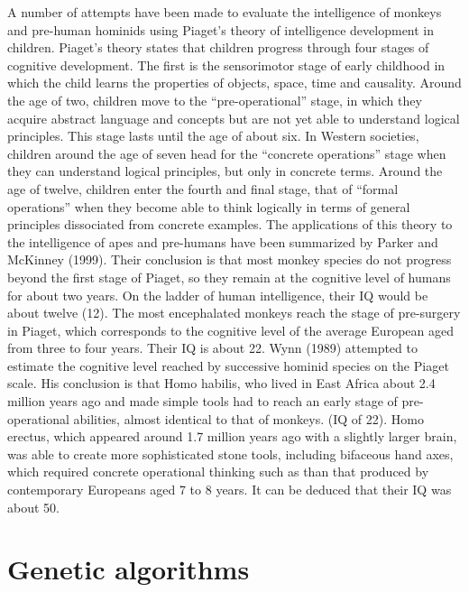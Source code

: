 A number of attempts have been made to evaluate the intelligence of monkeys and pre-human hominids
using Piaget’s theory of intelligence development in children. 
Piaget’s theory states that children progress through four stages of cognitive development.
The first is the sensorimotor stage of early childhood in which the child learns the properties of
objects, space, time and causality. 
Around the age of two, children move to the ``pre-operational'' stage, in which they acquire
abstract language and concepts but are not yet able to understand logical principles. 
This stage lasts until the age of about six. In Western societies, children around the age of
seven head for the ``concrete operations'' stage when they can understand logical principles,
but only in concrete terms.
Around the age of twelve, children enter the fourth and final stage, that of 
``formal operations'' when they become able to think logically in terms of general principles
dissociated from concrete examples.
The applications of this theory to the intelligence of apes and pre-humans have been summarized by
Parker and McKinney (1999).
Their conclusion is that most monkey species do not progress beyond the first stage of Piaget,
so they remain at the cognitive level of humans for about two years.
On the ladder of human intelligence, their IQ would be about twelve (12).
The most encephalated monkeys reach the stage of pre-surgery in Piaget, which corresponds to
the cognitive level of the average European aged from three to four years.
Their IQ is about 22. Wynn (1989) attempted to estimate the cognitive level reached by successive
hominid species on the Piaget scale.
His conclusion is that Homo habilis, who lived in East Africa about 2.4 million years ago and
made simple tools had to reach an early stage of pre-operational abilities, almost identical to
that of monkeys. (IQ of 22). Homo erectus, which appeared around 1.7 million years ago with a
slightly larger brain, was able to create more sophisticated stone tools, including bifaceous hand
axes, which required concrete operational thinking such as than that produced by contemporary
Europeans aged 7 to 8 years. It can be deduced that their IQ was about 50.



\section{Genetic algorithms}

